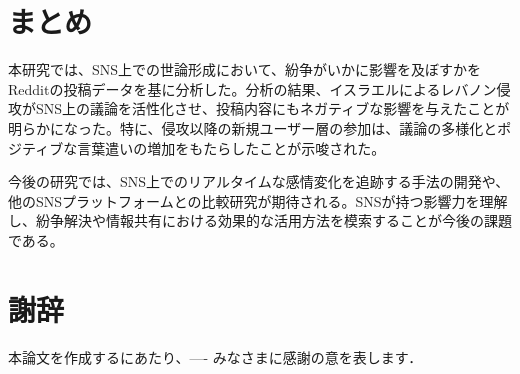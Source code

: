 \documentclass[11pt, a4j]{jreport}
\begin{document}
    \chapter{まとめ}
    
    本研究では、SNS上での世論形成において、紛争がいかに影響を及ぼすかをRedditの投稿データを基に分析した。分析の結果、イスラエルによるレバノン侵攻がSNS上の議論を活性化させ、投稿内容にもネガティブな影響を与えたことが明らかになった。特に、侵攻以降の新規ユーザー層の参加は、議論の多様化とポジティブな言葉遣いの増加をもたらしたことが示唆された。
    
    今後の研究では、SNS上でのリアルタイムな感情変化を追跡する手法の開発や、他のSNSプラットフォームとの比較研究が期待される。SNSが持つ影響力を理解し、紛争解決や情報共有における効果的な活用方法を模索することが今後の課題である。

    \chapter*{謝辞} %
    本論文を作成するにあたり、---- みなさまに感謝の意を表します．


    \renewcommand{\bibname}{参考文献} %
\end{document}
